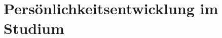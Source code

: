 \newcommand{\fibelpeentry}[2]{
	\settowidth{\hangindent}{00:00\hspace{1em}}
	\interlinepenalty=10000
	\makebox[\widthof{00:00\hspace{1em}}][r]{#1\hspace{1em}}\ignorespaces#2%
}

\section{Persönlichkeitsentwicklung im Studium}
